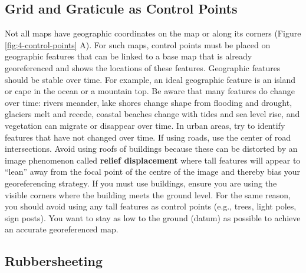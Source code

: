 \documentclass[
]{book}
\begin{document}
\hypertarget{grid-and-graticule-as-control-points}{%
\subsection{Grid and Graticule as Control Points}\label{grid-and-graticule-as-control-points}}

Not all maps have geographic coordinates on the map or along its corners (Figure \ref{fig:4-control-points} A). For such maps, control points must be placed on geographic features that can be linked to a base map that is already georeferenced and shows the locations of these features. Geographic features should be stable over time. For example, an ideal geographic feature is an island or cape in the ocean or a mountain top. Be aware that many features do change over time: rivers meander, lake shores change shape from flooding and drought, glaciers melt and recede, coastal beaches change with tides and sea level rise, and vegetation can migrate or disappear over time. In urban areas, try to identify features that have not changed over time. If using roads, use the center of road intersections. Avoid using roofs of buildings because these can be distorted by an image phenomenon called \textbf{relief displacement} where tall features will appear to ``lean'' away from the focal point of the centre of the image and thereby bias your georeferencing strategy. If you must use buildings, ensure you are using the visible corners where the building meets the ground level. For the same reason, you should avoid using any tall features as control points (e.g., trees, light poles, sign posts). You want to stay as low to the ground (datum) as possible to achieve an accurate georeferenced map.

\hypertarget{rubbersheeting}{%
\subsection{Rubbersheeting}\label{rubbersheeting}}
\end{document}
